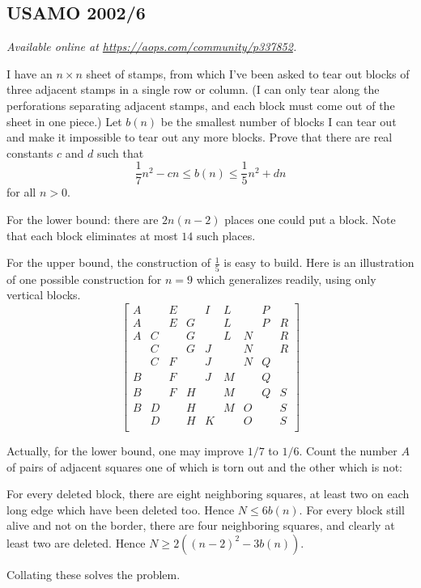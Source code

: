 \documentclass[11pt]{scrartcl}
\begin{document}
\subsection{USAMO 2002/6}
\textsl{Available online at \url{https://aops.com/community/p337852}.}
\begin{mdframed}[style=mdpurplebox,frametitle={Problem statement}]
I have an $n \times n$ sheet of stamps, from which I've been asked
to tear out blocks of three adjacent stamps in a single row or column.
(I can only tear along the perforations separating adjacent stamps,
and each block must come out of the sheet in one piece.)
Let $b(n)$ be the smallest number of blocks I can tear out
and make it impossible to tear out any more blocks.
Prove that there are real constants $c$ and $d$ such that
\[ \frac{1}{7} n^2 - cn \leq b(n) \leq \frac{1}{5} n^2 + dn  \]
for all $n > 0$.
\end{mdframed}
For the lower bound: there are $2n(n-2)$ places one could put a block.
Note that each block eliminates at most $14$ such places.

For the upper bound, the construction of $\frac15$ is easy to build.
Here is an illustration of one possible construction
for $n=9$ which generalizes readily,
using only vertical blocks.
\[
\begin{bmatrix}
  A &   & E &   & I & L &   & P &   \\
  A &   & E & G &   & L &   & P & R \\
  A & C &   & G &   & L & N &   & R \\
    & C &   & G & J &   & N &   & R \\
    & C & F &   & J &   & N & Q &   \\
  B &   & F &   & J & M &   & Q &   \\
  B &   & F & H &   & M &   & Q & S \\
  B & D &   & H &   & M & O &   & S \\
    & D &   & H & K &   & O &   & S \\
\end{bmatrix}
\]

Actually, for the lower bound,
one may improve $1/7$ to $1/6$.
Count the number $A$ of pairs of adjacent squares
one of which is torn out and the other which is not:
\begin{itemize}
  \ii For every deleted block, there are eight neighboring squares,
  at least two on each long edge which have been deleted too.
  Hence $N \le 6b(n)$.
  \ii For every block still alive and not on the border, there are
  four neighboring squares, and clearly at least two are deleted.
  Hence $N \ge 2\left( (n-2)^2 - 3b(n) \right)$.
\end{itemize}
Collating these solves the problem.
\pagebreak
\end{document}

